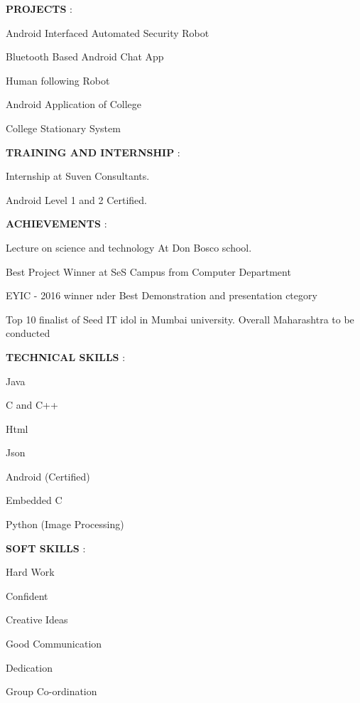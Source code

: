 \documentclass{article}
\begin{document}
 \begin{flushleft}
 \textbf{PROJECTS} :
  \enumerate
  \item Android Interfaced Automated Security Robot
  \item Bluetooth Based Android Chat App
  \item Human following Robot
  \item Android Application of College
  \item College Stationary System
  
 \end{flushleft}

 
 \begin{flushleft}
 \textbf{TRAINING AND INTERNSHIP} :
  \itemize
  \item Internship at Suven Consultants.
  \item Android Level 1 and 2 Certified.
  
 \end{flushleft}
 
 \begin{flushleft}
 \textbf{ACHIEVEMENTS} :
 \enumerate
 \item Lecture on science and technology At Don Bosco school.
 \item Best Project Winner at SeS Campus from Computer Department
 \item EYIC - 2016  winner nder Best Demonstration and  presentation ctegory
 \item Top  10 finalist of Seed IT idol in Mumbai university. Overall Maharashtra to be conducted
 
\end{flushleft}


\begin{flushleft}
 \textbf{TECHNICAL SKILLS} :
 \itemize
 \item Java
 \item  C and C++
 \item Html
 \item Json
 \item Android (Certified)
 \item Embedded C
 \item Python (Image Processing)

\end{flushleft}

\begin{flushleft}
 \textbf{SOFT SKILLS} :
 \enumerate
 \item Hard Work
 \item Confident
 \item Creative Ideas
 \item Good Communication
 \item Dedication
 \item Group Co-ordination

 \end{flushleft}
 
\end{document}
